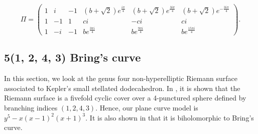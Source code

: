 \documentclass[12pt,reqno]{amsart}
\newtheorem{theorem}{Theorem}
\newtheorem{lemma}[theorem]{Lemma}
\theoremstyle{definition}
\theoremstyle{remark}
\begin{document}
$$\Pi = \begin{pmatrix} 1 & i & -1 & (b + \sqrt{2}) e^{\frac{i \pi }{4}} & (b + \sqrt{2}) e^{\frac{3 i \pi }{4}} & (b + \sqrt{2}) e^{-\frac{3 i \pi }{4}} \\
 1 & -1 & 1 & c i & -c i & c i \\
 1 & -i & -1 & b e^{\frac{3 \pi i}{4}} & b e^{\frac{9 \pi i}{4}} & b e^{\frac{15 \pi i}{4}}\end{pmatrix}.$$ 
 
 








\subsection{5(1, 2, 4, 3) Bring's curve}

In this section, we look at the genus four non-hyperelliptic Riemann surface associated to Kepler's small stellated dodecahedron. In \cite{matti}, it is shown that the Riemann surface is a fivefold cyclic cover over a 4-punctured sphere defined by branching indices $(1, 2, 4, 3).$ Hence, our plane curve model is $y^5 - x(x - 1)^2(x + 1)^3.$ It is also shown in \cite{matti} that it is biholomorphic to Bring's curve. 
\end{document}
